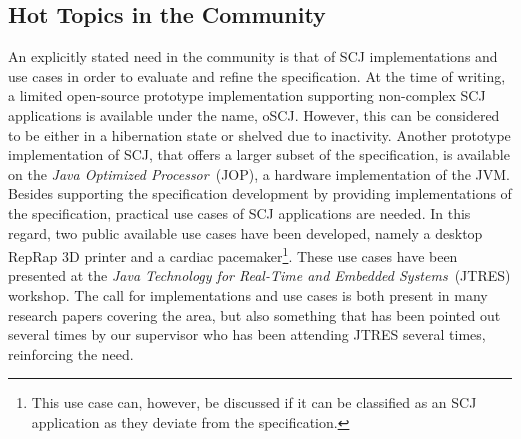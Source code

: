 

\subsection{Hot Topics in the Community} %
\label{sub:interestingresearch}
An explicitly stated need in the community is that of SCJ implementations and use cases\cite{Schoeberl:2012:SCJonJava} in order to evaluate and refine the specification.
At the time of writing, a limited open-source prototype implementation supporting non-complex SCJ applications is available under the name, oSCJ\cite{oSCJ}. However, this can be considered to be either in a hibernation state or shelved due to inactivity. Another prototype implementation of SCJ, that offers a larger subset of the specification, is available on the \textit{Java Optimized Processor}~(JOP), a hardware implementation of the JVM\cite{Schoeberl:2012:SCJonJava}. Besides supporting the specification development by providing implementations of the specification, practical use cases of SCJ applications are needed. In this regard, two public available use cases have been developed, namely a desktop RepRap 3D printer\cite{Schoeberl:2012:RepRap} and a cardiac pacemaker\cite{Singh:2012:CPC:2388936.2388948}\footnote{This use case can, however, be discussed if it can be classified as an SCJ application as they deviate from the specification.}. These use cases have been presented at the \textit{Java Technology for Real-Time and Embedded Systems}~(JTRES) workshop. The call for implementations and use cases is both present in many research papers covering the area, but also something that has been pointed out several times by our supervisor who has been attending JTRES several times, reinforcing the need.

